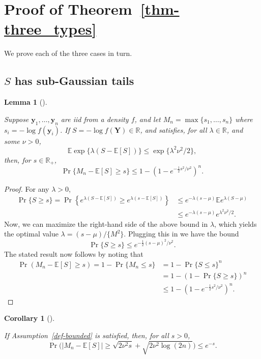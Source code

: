 \documentclass[
  12pt]{article}
\newcommand{\E}{\mathbb{E}}
\theoremstyle{definition}
\theoremstyle{plain}
\newtheorem{corollary}{Corollary}[section]
\theoremstyle{plain}
\theoremstyle{plain}
\newtheorem{lemma}{Lemma}[section]
\theoremstyle{remark}
\begin{document}
\section{\texorpdfstring{Proof of
Theorem~\ref{thm-three_types}}{Proof of Theorem~}}\label{proof-of-thm-three_types}

We prove each of the three cases in turn.

\subsection{\texorpdfstring{\(S\) has sub-Gaussian
tails}{S has sub-Gaussian tails}}\label{s-has-sub-gaussian-tails}

\begin{lemma}[]\protect\hypertarget{lem-bounds}{}\label{lem-bounds}

Suppose \(\bm{y}_1,\dots,\bm{y}_n\) are iid from a density \(f\), and
let \(M_n = \max\{s_1,\dots,s_n\}\) where \(s_i = -\log f(\bm{y}_i)\).
If \(S =-\log f(\bm{Y})\in\mathbb{R}\), and satisfies, for all
\(\lambda\in\mathbb{R}\), and some \(\nu>0\), \[
\E \exp\{\lambda (S-\E[S])\}\le \exp\{\lambda^2 \nu^2/2\},
\] then, for \(s\in\mathbb{R}_+\), \[
\Pr\{M_n-\E[S]\ge s\}\le 1-\left(1-e^{-\frac{1}{2}s^2/\nu^2}\right)^n.
\]

\end{lemma}

\begin{proof}
For any \(\lambda>0\), \begin{align}
\Pr\{S\ge s\} =
\Pr\left\{e^{\lambda (S-\E[S])}\ge e^{\lambda (s-\E[S])}\right\}
 & \le e^{-\lambda(s-\mu)}\E e^{\lambda (S-\mu)} \\
 & \le e^{-\lambda(s-\mu)}e^{\lambda^2\nu^2/2}.
\end{align} Now, we can maximize the right-hand side of the above bound
in \(\lambda\), which yields the optimal value
\(\lambda=(s-\mu)/\{M^2\}\). Plugging this in we have the bound \[
\Pr\{S\ge s\}\le e^{-\frac{1}{2}(s-\mu)^2/\nu^2}.
\] The stated result now follows by noting that \begin{align}
\Pr\left(M_n-\E[S]\ge s\right) = 1-\Pr\{M_n\le s\}
 & = 1-\Pr\{S\le s\}^n                       \\
 & = 1-(1-\Pr\{S\ge s\})^n                           \\
 & \le 1-\left(1-e^{-\frac{1}{2}s^2/\nu^2}\right)^n.
\end{align}
\end{proof}

\begin{corollary}[]\protect\hypertarget{cor-one}{}\label{cor-one}

If Assumption~\ref{def-bounded} is satisfied, then, for all \(s>0\), \[
\Pr\Big(|M_n-\E[S]| \ge \sqrt{2\nu^2s} + \sqrt{2\nu^2\log(2n)}\Big) \le e^{-s}.
\]

\end{corollary}
\end{document}
